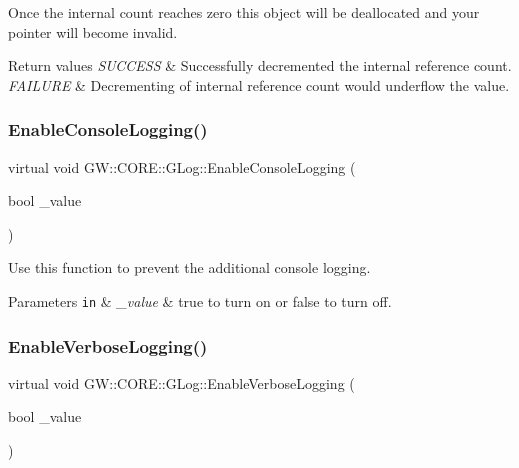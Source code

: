 Once the internal count reaches zero this object will be deallocated and your pointer will become invalid.


\begin{DoxyRetVals}{Return values}
{\em S\+U\+C\+C\+E\+SS} & Successfully decremented the internal reference count. \\
\hline
{\em F\+A\+I\+L\+U\+RE} & Decrementing of internal reference count would underflow the value. \\
\hline
\end{DoxyRetVals}
\hypertarget{class_g_w_1_1_c_o_r_e_1_1_g_log_a9a486a646a0a02bb5724100c1849fcec}{}\label{class_g_w_1_1_c_o_r_e_1_1_g_log_a9a486a646a0a02bb5724100c1849fcec} 
\subsubsection{\texorpdfstring{Enable\+Console\+Logging()}{EnableConsoleLogging()}}
{\footnotesize\ttfamily virtual void G\+W\+::\+C\+O\+R\+E\+::\+G\+Log\+::\+Enable\+Console\+Logging (\begin{DoxyParamCaption}\item[{bool}]{\+\_\+value }\end{DoxyParamCaption})\hspace{0.3cm}{\ttfamily [pure virtual]}}

Use this function to prevent the additional console logging.


\begin{DoxyParams}[1]{Parameters}
\mbox{\tt in}  & {\em \+\_\+value} & true to turn on or false to turn off. \\
\hline
\end{DoxyParams}
\hypertarget{class_g_w_1_1_c_o_r_e_1_1_g_log_ac14e65291dba9480deadd772a8f0e307}{}\label{class_g_w_1_1_c_o_r_e_1_1_g_log_ac14e65291dba9480deadd772a8f0e307} 
\subsubsection{\texorpdfstring{Enable\+Verbose\+Logging()}{EnableVerboseLogging()}}
{\footnotesize\ttfamily virtual void G\+W\+::\+C\+O\+R\+E\+::\+G\+Log\+::\+Enable\+Verbose\+Logging (\begin{DoxyParamCaption}\item[{bool}]{\+\_\+value }\end{DoxyParamCaption})\hspace{0.3cm}{\ttfamily [pure virtual]}}

